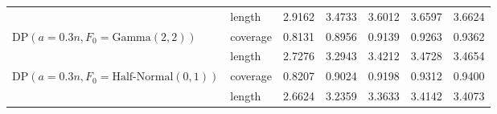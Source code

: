 \documentclass[11pt]{article}
\begin{document}
\begin{table}[htbp]
{\begin{tabular}{l l | c c c c c}
& length & 2.9162 & 3.4733 & 3.6012 & 3.6597 & 3.6624 \\
DP$(a=0.3n,F_0=\text{Gamma}(2,2))$
& coverage & 0.8131 & 0.8956 & 0.9139 & 0.9263 & 0.9362 \\
& length &  2.7276 & 3.2943 & 3.4212 & 3.4728 & 3.4654 \\
DP$(a=0.3n,F_0=\text{Half-Normal}(0,1))$
& coverage & 0.8207 & 0.9024 & 0.9198 & 0.9312 & 0.9400  \\
& length & 2.6624 & 3.2359 &  3.3633 & 3.4142 & 3.4073 \\
\hline
\end{tabular}
}
\end{table}
\end{document}
